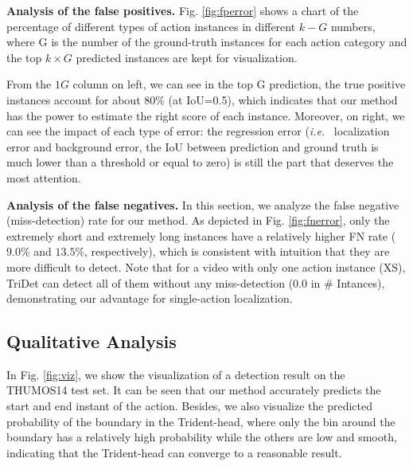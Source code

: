 \documentclass[10pt,twocolumn,letterpaper]{article}
\def\ie{{\em i.e.}}
\newcommand{\figref}[1]{Fig. \ref{#1}}
\newcommand{\myPara}[1]{\vspace{.05in}\noindent\textbf{#1}}
\begin{document}
\myPara{Analysis of the false positives.}
\figref{fig:fperror} shows a chart of the percentage of different types of action instances in different $k-G$ numbers, where G is the number of the ground-truth instances for each action category and the top $k \times G$ predicted instances are kept for visualization. 

From the $1G$ column on left, we can see in the top G prediction, the true positive instances account for about $80\%$ (at IoU=0.5), which indicates that our method has the power to estimate the right score of each instance. Moreover, on right, we can see the impact of each type of error: the regression error (\ie~ localization error and background error, the IoU between prediction and ground truth is much lower than a threshold or equal to zero) is still the part that deserves the most attention. 


\myPara{Analysis of the false negatives.}
In this section, we analyze the false negative (miss-detection) rate for our method. As depicted in \figref{fig:fnerror}, only the extremely short and extremely long instances have a relatively higher FN rate ($9.0\%$ and $13.5\%$, respectively), which is consistent with intuition that they are more difficult to detect. Note that for a video with only one action instance (XS), TriDet can detect all of them without any miss-detection ($0.0$ in \# Intances), demonstrating our advantage for single-action localization.


\begin{figure*}[t]
\end{figure*}

\subsection{Qualitative Analysis}
In \figref{fig:viz}, we show the visualization of a detection result on the THUMOS14 test set. It can be seen that our method accurately predicts the start and end instant of the action. Besides, we also visualize the predicted probability of the boundary in the Trident-head, where only the bin around the boundary has a relatively high probability while the others are low and smooth, indicating that the Trident-head can converge to a reasonable result.
\end{document}
